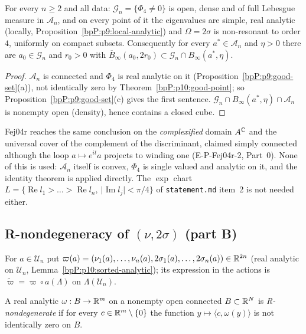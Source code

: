 \begin{corollary}\label{bpP:p10:good-set}
For every $n\ge2$ and all data: $\mathcal G_n=\{\Phi_4\ne0\}$ is open, dense and of full Lebesgue measure in $\mathcal A_n$, and on every point of it the eigenvalues are simple, real analytic (locally, Proposition~\ref{bpP:p9:local-analytic}) and $\Omega=2\sigma$ is non-resonant to order $4$, uniformly on compact subsets. Consequently for every $a^*\in\mathcal A_n$ and $\eta>0$ there are $a_0\in\mathcal G_n$ and $r_0>0$ with $\overline B_\infty(a_0,2r_0)\subset\mathcal G_n\cap B_\infty(a^*,\eta)$.
\end{corollary}
\begin{proof}
$\mathcal A_n$ is connected and $\Phi_4$ is real analytic on it (Proposition~\ref{bpP:p9:good-set}(a)), not identically zero by Theorem~\ref{bpP:p10:good-point}; so Proposition~\ref{bpP:p9:good-set}(c) gives the first sentence. $\mathcal G_n\cap B_\infty(a^*,\eta)\cap\mathcal A_n$ is nonempty open (density), hence contains a closed cube.
\end{proof}

\begin{remark}\label{bpP:p10:noncont}
Fej04r reaches the same conclusion on the \emph{complexified} domain $A^{\mathbb{C}}$ and the universal cover of the complement of the discriminant, claimed simply connected although the loop $a\mapsto e^{it}a$ projects to winding one (E-P-Fej04r-2, Part~0). None of this is used: $\mathcal A_n$ itself is convex, $\Phi_4$ is single valued and analytic on it, and the identity theorem is applied directly. The $\exp$ chart $L=\{\operatorname{Re}l_1>\dots>\operatorname{Re}l_n,\ \lvert\operatorname{Im}l_j\rvert<\pi/4\}$ of \texttt{statement.md} item~2 is not needed either.
\end{remark}

\subsection{R-nondegeneracy of $(\nu,2\sigma)$ (part B)}\label{bpP:p10:sec-rnd}

For $a\in\mathcal U_n$ put $\varpi(a)=(\nu_1(a),\dots,\nu_n(a),2\sigma_1(a),\dots,2\sigma_n(a))\in\mathbb{R}^{2n}$ (real analytic on $\mathcal U_n$, Lemma~\ref{bpP:p10:sorted-analytic}); its expression in the actions is $\tilde\varpi=\varpi\circ a(\Lambda)$ on $\Lambda(\mathcal U_n)$.

\begin{definition}\label{bpP:p10:rnd-def}
A real analytic $\omega:B\to\mathbb{R}^m$ on a nonempty open connected $B\subset\mathbb{R}^N$ is \emph{R-nondegenerate} if for every $c\in\mathbb{R}^m\setminus\{0\}$ the function $y\mapsto\langle c,\omega(y)\rangle$ is not identically zero on $B$.
\end{definition}

